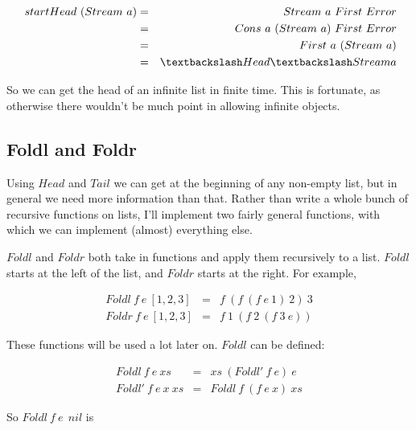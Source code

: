 \begin{eqnarray*}
   \ start{Head~(Stream~a)}  
   &  =  &  Stream~a~First~Error  \\
   &  =  &  Cons~a~(Stream~a)~First~Error  \\
   &  =  &  First~a~(Stream~a)  \\
   &  =  &  \textbackslash Head{\textbackslash Stream{a}}
\end{eqnarray*}


So we can get the head of an infinite list in finite time.  This is
fortunate, as otherwise there wouldn't be much point in allowing
infinite objects. 


\begin{teX}
\def\Head#1{#1\First\Error}
\def\Tail#1{#1\Second\Error}
\end{teX}



\subsection{Foldl and Foldr}

Using $Head$ and $Tail$ we can get at the beginning of any non-empty list,
but in general we need more information than that.  Rather than write
a whole bunch of recursive functions on lists, I'll implement two
fairly general functions, with which we can implement (almost) everything
else.

$Foldl$ and $Foldr$ both take in functions and apply them recursively
to a list.  $Foldl$ starts at the left of the list, and $Foldr$
starts at the right.  For example,

\begin{eqnarray*}
   Foldl~f~e~[1,2,3]  &  =  &  f~(f~(f~e~1)~2)~3  \\
   Foldr~f~e~[1,2,3]  &  =  &  f~1~(f~2~(f~3~e))
\end{eqnarray*}

These functions will be used a lot later on.  $Foldl$ can be defined:

\begin{eqnarray*}
      Foldl~f~e~xs  &  =  &  xs~(Foldl'~f~e)~e  \\
   Foldl'~f~e~x~xs  &  =  &  Foldl~f~(f~e~x)~xs
\end{eqnarray*}

So $Foldl~f~e~\ nil$ is

